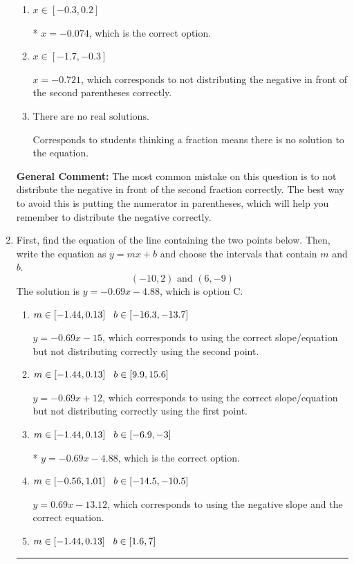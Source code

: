 \documentclass{extbook}[14pt]
\newcommand{\litem}[1]{\item #1

\rule{\textwidth}{0.4pt}}
\begin{document}
\begin{enumerate}
{\begin{enumerate}[label=\Alph*.]
$x = 0.721$, which corresponds to not distributing the negative in front of the first parentheses correctly.
\item \( x \in [-0.3, 0.2] \)

* $x = -0.074$, which is the correct option.
\item \( x \in [-1.7, -0.3] \)

$x = -0.721$, which corresponds to not distributing the negative in front of the second parentheses correctly.
\item \( \text{There are no real solutions.} \)

Corresponds to students thinking a fraction means there is no solution to the equation.
\end{enumerate}

\textbf{General Comment:} The most common mistake on this question is to not distribute the negative in front of the second fraction correctly. The best way to avoid this is putting the numerator in parentheses, which will help you remember to distribute the negative correctly.
}
\litem{
First, find the equation of the line containing the two points below. Then, write the equation as $ y=mx+b $ and choose the intervals that contain $m$ and $b$.
\[ (-10, 2) \text{ and } (6, -9) \]The solution is \( y = -0.69x -4.88 \), which is option C.\begin{enumerate}[label=\Alph*.]
\item \( m \in [-1.44, 0.13] \hspace*{3mm} b \in [-16.3, -13.7] \)

 $y = -0.69x -15$, which corresponds to using the correct slope/equation but not distributing correctly using the second point.
\item \( m \in [-1.44, 0.13] \hspace*{3mm} b \in [9.9, 15.6] \)

 $y = -0.69x + 12$, which corresponds to using the correct slope/equation but not distributing correctly using the first point.
\item \( m \in [-1.44, 0.13] \hspace*{3mm} b \in [-6.9, -3] \)

* $y = -0.69x -4.88$, which is the correct option.
\item \( m \in [-0.56, 1.01] \hspace*{3mm} b \in [-14.5, -10.5] \)

 $y = 0.69x -13.12$, which corresponds to using the negative slope and the correct equation.
\item \( m \in [-1.44, 0.13] \hspace*{3mm} b \in [1.6, 7] \)


\end{enumerate}}
\end{enumerate}
\end{document}
